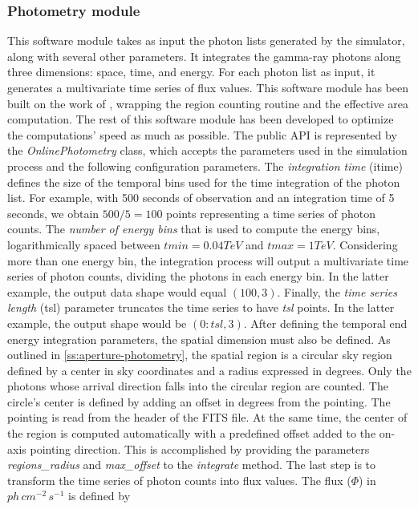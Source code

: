 \subsubsection{Photometry module}
\label{ss:photometry-module}
This software module takes as input the photon lists generated by the simulator, along with several other parameters. It integrates the gamma-ray photons along three dimensions: space, time, and energy. For each photon list as input, it generates a multivariate time series of flux values. This software module has been built on the work of \cite{tampieri2020real}, wrapping the region counting routine and the effective area computation. The rest of this software module has been developed to optimize the computations' speed as much as possible. 
The public API is represented by the \textit{OnlinePhotometry} class, which accepts the parameters used in the simulation process and the following configuration parameters. The \textit{integration time} (itime) defines the size of the temporal bins used for the time integration of the photon list. For example, with 500 seconds of observation and an integration time of 5 seconds, we obtain $500/5=100$ points representing a time series of photon counts. The \textit{number of energy bins} that is used to compute the energy bins, logarithmically spaced between $tmin=0.04 TeV$ and $tmax=1 TeV$. Considering more than one energy bin, the integration process will output a multivariate time series of photon counts, dividing the photons in each energy bin. In the latter example, the output data shape would equal $(100,3)$. Finally, the \textit{time series length} (tsl) parameter truncates the time series to have \textit{tsl} points. In the latter example, the output shape would be $(0:tsl, 3)$. After defining the temporal end energy integration parameters, the spatial dimension must also be defined. As outlined in \autoref{ss:aperture-photometry}, the spatial region is a circular sky region defined by a center in sky coordinates and a radius expressed in degrees. Only the photons whose arrival direction falls into the circular region are counted. The circle's center is defined by adding an offset in degrees from the pointing. The pointing is read from the header of the FITS file. At the same time, the center of the region is computed automatically with a predefined offset added to the on-axis pointing direction. This is accomplished by providing the parameters \textit{regions\_radius} and \textit{max\_offset} to the \textit{integrate} method. The last step is to transform the time series of photon counts into flux values. The flux ($\Phi$) in $ph\,cm^{-2}\,s^{-1}$ is defined by
